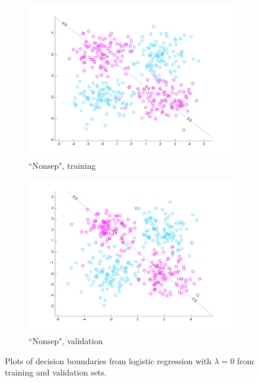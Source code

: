 \begin{figure}[h!]
\begin{subfigure}[b]{0.22\textwidth}
	\includegraphics[scale=0.25]{hw2_1_nonsep_a_0.pdf}
	\caption{``Nonsep", training}\label{fig:data_nonsep_a}
    \end{subfigure}  
    \quad
    \begin{subfigure}[b]{0.22\textwidth}
	\includegraphics[scale=0.25]{hw2_1_nonsep_b_0.pdf}
	\caption{``Nonsep", validation}\label{fig:data_nonsep_b}
    \end{subfigure}  
    \caption{Plots of decision boundaries from logistic regression with $\lambda=0$ from training and validation sets.}  \label{fig:LR_plots}  
\end{figure}


